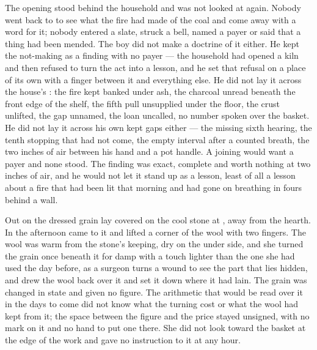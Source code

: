 The opening stood behind the household and was not looked at again. Nobody went back to  to see what the fire had made of the coal and come away with a word for it; nobody entered a slate, struck a bell, named a payer or said that a thing had been mended. The boy did not make a doctrine of it either. He kept the not-making as a finding with no payer --- the household had opened a kiln and then refused to turn the act into a lesson, and he set that refusal on a place of its own with a finger between it and everything else. He did not lay it across the house's : the fire kept banked under ash, the charcoal unread beneath the front edge of the shelf, the fifth pull unsupplied under the floor, the crust unlifted, the gap unnamed, the loan uncalled, no number spoken over the basket. He did not lay it across his own kept gaps either --- the missing sixth hearing, the tenth stopping that had not come, the empty interval after a counted breath, the two inches of air between his hand and a pot handle. A joining would want a payer and none stood. The finding was exact, complete and worth nothing at two inches of air, and he would not let it stand up as a lesson, least of all a lesson about a fire that had been lit that morning and had gone on breathing in fours behind a wall.

Out on  the dressed grain lay covered on the cool stone at , away from the hearth. In the afternoon  came to it and lifted a corner of the wool with two fingers. The wool was warm from the stone's keeping, dry on the under side, and she turned the grain once beneath it for damp with a touch lighter than the one she had used the day before, as a surgeon turns a wound to see the part that lies hidden, and drew the wool back over it and set it down where it had lain. The grain was changed in state and given no figure. The arithmetic that would be read over it in the days to come did not know what the turning cost or what the wool had kept from it; the space between the figure and the price stayed unsigned, with no mark on it and no hand to put one there. She did not look toward the basket at the edge of the work and gave no instruction to it at any hour.

